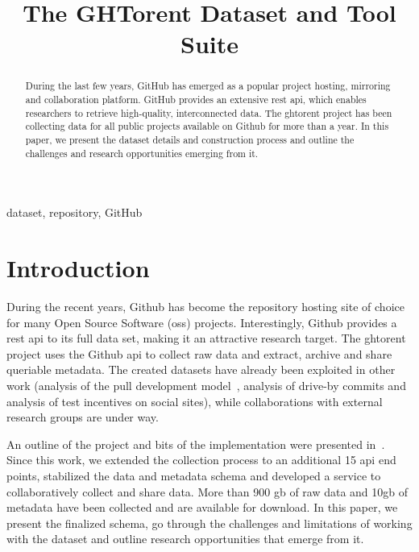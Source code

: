 \documentclass[conference,letter]{IEEEtran}
\begin{document}
\title{The GHTorent Dataset and Tool Suite}

\author{ 
}

\maketitle

\begin{abstract} 
  
  During the last few years, GitHub has emerged as a popular project hosting,
  mirroring and collaboration platform. GitHub provides an extensive {\sc rest
  api}, which enables researchers to retrieve high-quality, interconnected data.
  The {\sc ght}orent project has been collecting data for all public projects
  available on Github for more than a year. In this paper, we present the dataset
  details and construction process and outline the challenges and research
  opportunities emerging from it.

\end{abstract}

\begin{IEEEkeywords}
dataset, repository, GitHub
\end{IEEEkeywords}

\section{Introduction} During the recent years, Github has become the repository
hosting site of choice for many Open Source Software ({\sc oss}) projects.
Interestingly, Github provides a {\sc rest api} to its full data set, making it
an attractive research target. The {\sc ght}orent project uses the Github {\sc api}
to collect raw data and extract, archive and share queriable metadata. The
created datasets have already been exploited in other work (analysis of the pull
development model~\cite{GPD13}, analysis of drive-by commits and analysis of
test incentives on social sites),
while collaborations with external research groups are under way. 

An outline of the project and bits of the implementation were presented
in~\cite{GS12}. Since this work, we extended the collection process to an
additional 15 {\sc api} end points, stabilized the data and metadata schema and
developed a service to collaboratively collect and share data. More than 900{\sc
gb} of raw data and 10{\sc gb} of metadata have been collected and are available
for download. In this paper, we present the finalized schema, go through the
challenges and limitations of working with the dataset and outline research
opportunities that emerge from it.
\end{document}
